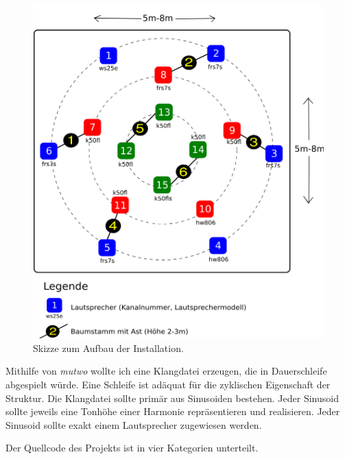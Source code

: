 \documentclass[12pt,a4paper,ngerman]{article}
\begin{document}
\begin{figure}[h!]
        \hspace{0.5cm}
        \includegraphics[scale=0.185]{pictures/setup-thanatos-trees.png}
    \caption{%
        Skizze zum Aufbau der Installation.
    }
\end{figure}

Mithilfe von \emph{mutwo} wollte ich eine Klangdatei erzeugen, die in Dauerschleife abgespielt würde.
Eine Schleife ist adäquat für die zyklischen Eigenschaft der Struktur.
Die Klangdatei sollte primär aus Sinusoiden bestehen.
Jeder Sinusoid sollte jeweils eine Tonhöhe einer Harmonie repräsentieren und realisieren.
Jeder Sinusoid sollte exakt einem Lautsprecher zugewiesen werden.

\smallskip

Der Quellcode des Projekts ist in vier Kategorien unterteilt.
\end{document}
